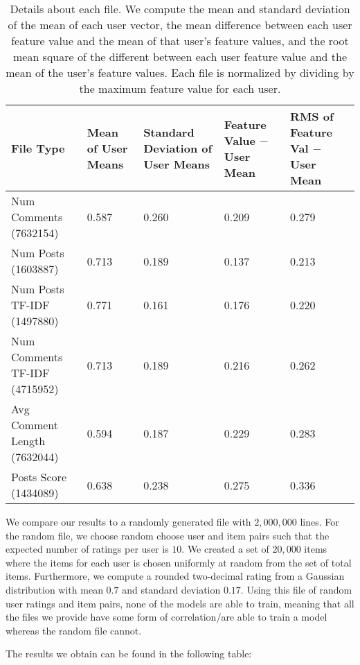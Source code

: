 \documentclass{article}
\begin{document}
\begin{table}
    \begin{tabular}{ |p{2.5cm}|p{2cm}|p{3cm}|p{3cm}|p{2.5cm}|}
    \hline
    File Type& Mean of User Means & Standard Deviation of User Means & Feature Value $-$ User Mean & RMS of Feature Val $-$ User Mean\\ \hline\hline
    Num Comments (7632154)& 0.587 & 0.260 & 0.209 & 0.279 \\ \hline
    Num Posts (1603887)& 0.713 & 0.189 & 0.137 & 0.213 \\ \hline
    Num Posts TF-IDF (1497880) & 0.771 & 0.161 &  0.176 & 0.220 \\ \hline
    Num Comments TF-IDF (4715952) & 0.713 & 0.189 & 0.216 & 0.262 \\ \hline
    Avg Comment Length (7632044) & 0.594 & 0.187 & 0.229 & 0.283 \\ \hline
    Posts Score (1434089) & 0.638 & 0.238 & 0.275 & 0.336 \\
    \hline
    \end{tabular}
    \caption{Details about each file. We compute the mean and standard deviation of the mean of each user vector,
     the mean difference between each user feature value and the mean of that user's feature values, and the root mean
     square of the different between each user feature value and the mean of the user's feature values. 
     Each file is normalized by dividing by the maximum feature value for each user.}\label{dataset-chars}
\end{table}

We compare our results to a randomly generated file with $2,000,000$ lines. For the random file, we choose random 
choose user and item pairs such that the expected number of ratings per user is $10$. We created a set of $20,000$ items
where the items for each user is chosen uniformly at random from the set of total items. Furthermore, we compute a 
rounded two-decimal rating from a Gaussian distribution with mean $0.7$ and standard deviation $0.17$. Using this
file of random user ratings and item pairs, none of the models are able to train, meaning that all the files
we provide have some form of correlation/are able to train a model whereas the random file cannot.

The results we obtain can be found in the following table:
\end{document}
